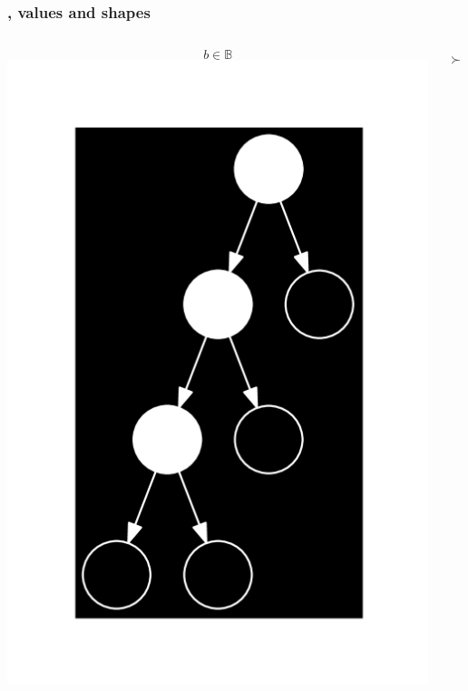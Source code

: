 \begin{frame}

\frametitle{\D{}, values and shapes}

\begin{columns}

\begin{center}
$$b\in\mathbb{B}$$
\includegraphics[scale=0.5]{figures/value}
\end{center}


\begin{center}
{\fontsize{40}{20}$\succ$}
\end{center}



\end{columns}
\end{frame}

